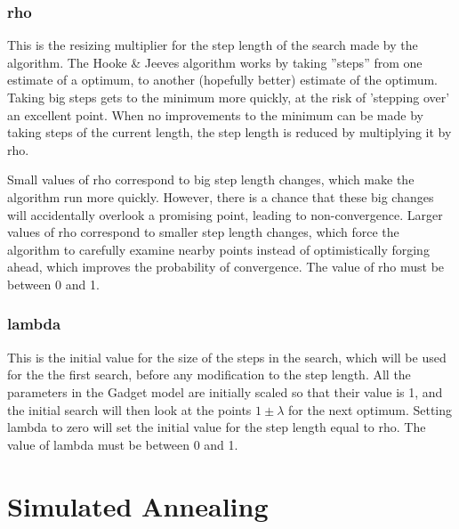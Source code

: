 \documentclass[10pt,twoside]{book}
\begin{document}
\subsubsection{rho}
This is the resizing multiplier for the step length of the search made by the algorithm.  The Hooke \& Jeeves algorithm works by taking ''steps'' from one estimate of a optimum, to another (hopefully better) estimate of the optimum.  Taking big steps gets to the minimum more quickly, at the risk of 'stepping over' an excellent point.  When no improvements to the minimum can be made by taking steps of the current length, the step length is reduced by multiplying it by rho.

\bigskip
Small values of rho correspond to big step length changes, which make the algorithm run more quickly.  However, there is a chance that these big changes will accidentally overlook a promising point, leading to non-convergence.  Larger values of rho correspond to smaller step length changes, which force the algorithm to carefully examine nearby points instead of optimistically forging ahead, which improves the probability of convergence.  The value of rho must be between 0 and 1.

\subsubsection{lambda}
This is the initial value for the size of the steps in the search, which will be used for the the first search, before any modification to the step length.  All the parameters in the Gadget model are initially scaled so that their value is 1, and the initial search will then look at the points $1 \pm \lambda$ for the next optimum.  Setting lambda to zero will set the initial value for the step length equal to rho.  The value of lambda must be between 0 and 1.


\section{Simulated Annealing}\label{sec:simann}
\end{document}
